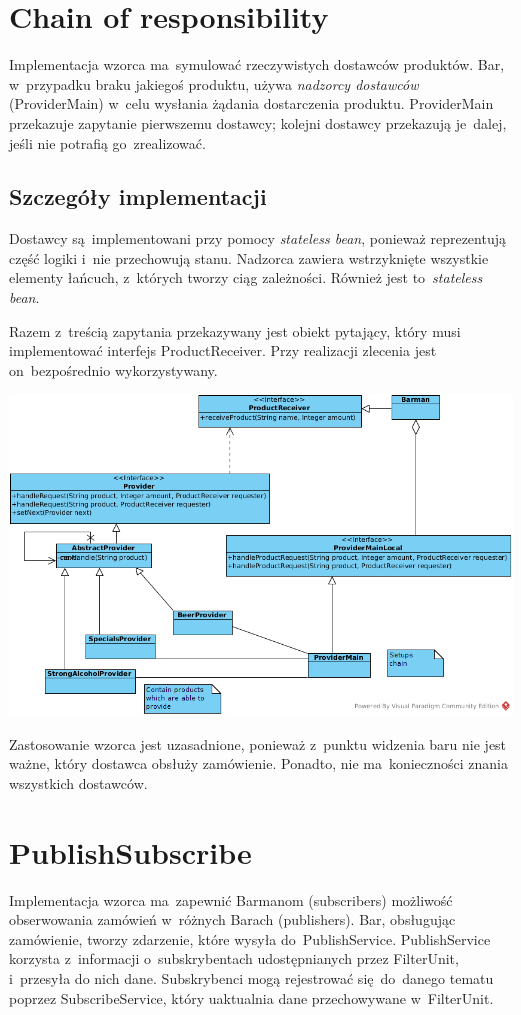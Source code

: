 \documentclass[11pt]{aghdpl}
\begin{document}
\section{Chain of responsibility}
Implementacja wzorca ma~symulować rzeczywistych dostawców produktów. Bar, w~przypadku braku jakiegoś produktu, używa \textit{nadzorcy dostawców} (ProviderMain) w~celu wysłania żądania dostarczenia produktu. ProviderMain przekazuje zapytanie pierwszemu dostawcy;
kolejni dostawcy przekazują je~dalej, jeśli nie potrafią go~zrealizować.

\subsection{Szczegóły implementacji}
Dostawcy są~implementowani przy pomocy \textit{stateless bean}, ponieważ reprezentują część logiki i~nie przechowują stanu. Nadzorca zawiera wstrzyknięte wszystkie elementy łańcuch, z~których tworzy ciąg zależności. Również jest to~\textit{stateless bean}.

Razem z~treścią zapytania przekazywany jest obiekt pytający, który musi implementować interfejs ProductReceiver. Przy realizacji zlecenia jest on~bezpośrednio wykorzystywany.
\begin{center}
 \includegraphics[width=16cm]{chain}
\end{center}

Zastosowanie wzorca jest uzasadnione, ponieważ z~punktu widzenia baru nie jest ważne, który dostawca obsłuży zamówienie. Ponadto, nie ma~konieczności znania wszystkich dostawców.

\section{PublishSubscribe}
Implementacja wzorca ma~zapewnić Barmanom (subscribers) możliwość obserwowania zamówień w~różnych Barach (publishers). Bar, obsługując zamówienie, tworzy zdarzenie, które wysyła do~PublishService. PublishService korzysta z~informacji o~subskrybentach udostępnianych przez FilterUnit, i~przesyła do nich dane. Subskrybenci mogą rejestrować się~do~danego tematu poprzez SubscribeService, który uaktualnia dane przechowywane w~FilterUnit.
\end{document}
